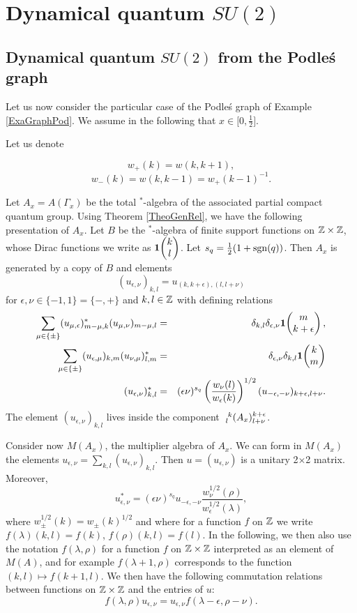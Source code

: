 
\section{Dynamical quantum $SU(2)$}

\subsection{Dynamical quantum $SU(2)$ from the Podle\'{s} graph}

Let us now consider the particular case of the Podle\'{s} graph of Example \ref{ExaGraphPod}. We assume in the following that $x\in \lbrack 0,\frac{1}{2}\rbrack$.

Let us denote

\[w_+(k) = w(k,k+1),\]\[w_-(k)  = w(k,k-1) = w_+(k-1)^{-1}.\] 

Let $A_x = A(\Gamma_x)$ be the total $^*$-algebra of the associated partial compact quantum group. Using Theorem \ref{TheoGenRel}, we have the following presentation of $A_x$. Let $B$ be the $^*$-algebra of finite support functions on $\Z\times \Z$, whose Dirac functions we write as $\UnitC{k}{l}$. Let $s_q = \frac{1}{2}(1+\sgn(q))$. Then $A_x$ is generated by a copy of $B$ and elements \[(u_{\epsilon,\nu})_{k,l} = u_{(k,k+\epsilon),(l,l+\nu)}\] for $\epsilon,\nu\in \{-1,1\}=\{-,+\}$ and $k,l\in \Z$ with defining relations \begin{eqnarray*} \sum_{\mu\in \{\pm\}} (u_{\mu,\epsilon})_{m-\mu,k}^* (u_{\mu,\nu})_{m-\mu,l}&=& \delta_{k,l} \delta_{\epsilon,\nu} \UnitC{m}{k+\epsilon},\\ \sum_{\mu\in \{\pm\}} (u_{\epsilon,\mu})_{k,m} (u_{\nu,\mu})_{l,m}^* &=& \delta_{\epsilon,\nu}\delta_{k,l} \UnitC{k}{m}\\ (u_{\epsilon,\nu})_{k,l}^* &=& (\epsilon\nu)^{s_q} \left(\frac{w_{\nu}(l)}{w_{\epsilon}(k)}\right)^{1/2} (u_{-\epsilon,-\nu})_{k+\epsilon,l+\nu}.\end{eqnarray*} The element $(u_{\epsilon,\nu})_{k,l}$ lives inside the component $\Gr{(A_x)}{k}{k+\epsilon}{l}{l+\nu}$.

Consider now $M(A_x)$, the multiplier algebra of $A_x$. We can form in $M(A_x)$ the elements $u_{\epsilon,\nu} = \sum_{k,l} (u_{\epsilon,\nu})_{k,l}$. Then $u=(u_{\epsilon,\nu})$ is a unitary 2$\times$2 matrix. Moreover, \begin{equation}\label{EqAdju}u_{\epsilon,\nu}^* = (\epsilon\nu)^{s_q} u_{-\epsilon,-\nu}\frac{w_{\nu}^{1/2}(\rho)}{w_{\epsilon}^{1/2}(\lambda)} ,\end{equation} where $w_{\pm}^{1/2}(k) = w_{\pm}(k)^{1/2}$ and where for a function $f$ on $\Z$ we write $f(\lambda)(k,l) = f(k)$, $f(\rho)(k,l) = f(l)$. In the following, we then also use the notation $f(\lambda,\rho)$ for a function $f$ on $\Z\times \Z$ interpreted as an element of $M(A)$, and for example $f(\lambda+1,\rho)$ corresponds to the function $(k,l)\mapsto f(k+1,l)$. We then have the following commutation relations between functions on $\Z\times \Z$ and the entries of $u$: \begin{equation}\label{EqGradu} f(\lambda,\rho)u_{\epsilon,\nu} = u_{\epsilon,\nu}f(\lambda-\epsilon,\rho-\nu).\end{equation}

